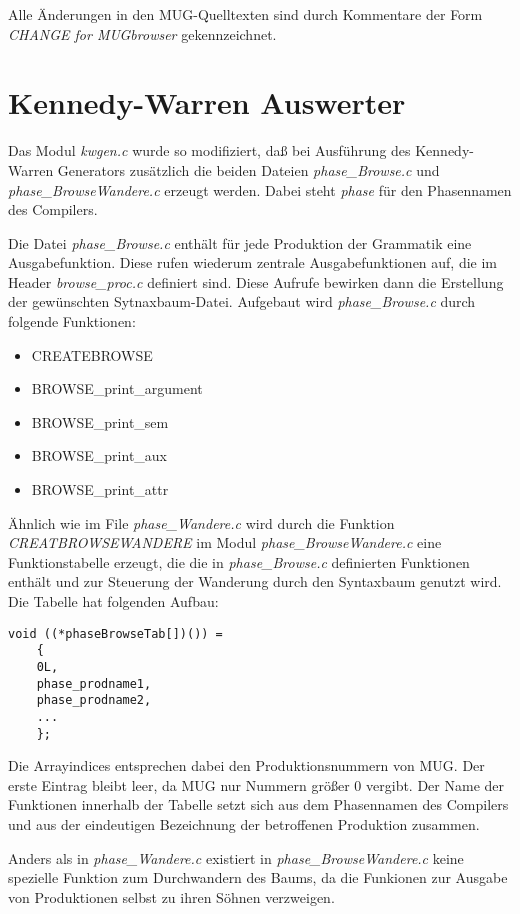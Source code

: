 Alle \"Anderungen in den MUG-Quelltexten sind durch Kommentare der Form {\it CHANGE for MUGbrowser} gekennzeichnet.

\section{Kennedy-Warren Auswerter}

Das Modul {\it kwgen.c} wurde so modifiziert, da\ss{} bei Ausf\"uhrung des Kennedy-Warren Generators zus\"atzlich die beiden Dateien {\it phase\_Browse.c} und
{\it phase\-\_Brow\-se\-Wan\-dere.c} erzeugt werden. Dabei steht {\it phase} f\"ur den Phasennamen des Compilers.

Die Datei {\it phase\_Browse.c} enth\"alt f\"ur jede Produktion der Grammatik eine Ausgabefunktion. Diese rufen wiederum zentrale Ausgabefunktionen
auf, die im Header {\it browse\_proc.c} definiert sind. Diese Aufrufe bewirken dann die Erstellung der gew\"unschten Sytnaxbaum-Datei. Aufgebaut wird
{\it phase\_Browse.c} durch folgende Funktionen: \begin{itemize} \item{CREATEBROWSE} \item{BROWSE\_print\_argument} \item{BROWSE\_print\_sem}
\item{BROWSE\_print\_aux} \item{BROWSE\_print\_attr} \end{itemize}

\"Ahnlich wie im File {\it phase\_Wandere.c} wird durch die Funktion {\it CREATBROWSEWANDERE} im Modul {\it phase\_BrowseWandere.c} eine
Funktionstabelle erzeugt, die die in {\it phase\_Browse.c} definierten Funktionen enth\"alt und zur Steuerung der Wanderung durch den Syntaxbaum genutzt
wird. Die Tabelle hat folgenden Aufbau:

\begin{small}\begin{verbatim}
void ((*phaseBrowseTab[])()) =
	{
	0L,
	phase_prodname1,
	phase_prodname2,
	...
	};
\end{verbatim}\end{small}

Die Arrayindices entsprechen dabei den Produktionsnummern von MUG. Der erste Eintrag bleibt leer, da MUG nur Nummern gr\"o\ss{}er 0 vergibt. Der Name
der Funktionen innerhalb der Tabelle setzt sich aus dem Phasennamen des Compilers und aus der eindeutigen Bezeichnung der betroffenen Produktion
zusammen.

Anders als in {\it phase\_Wandere.c} existiert in {\it phase\_BrowseWandere.c} keine spezielle Funktion zum Durchwandern des Baums, da die Funkionen
zur Ausgabe von Produktionen selbst zu ihren S\"ohnen verzweigen.

